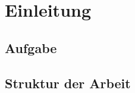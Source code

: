 \newpage
\fancyhead[L]{\textcolor{lightgrey}{\nouppercase{\rightmark}}}

\section{Einleitung}
\subsection{Aufgabe}
\subsection{Struktur der Arbeit}